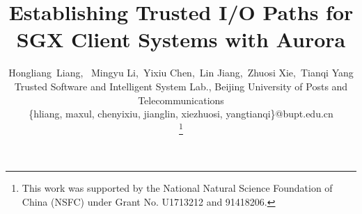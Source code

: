 \documentclass[journal,twocolumn,letterpaper,10pt]{ieee-sty/IEEEtran}
\begin{document}


\title{ Establishing Trusted I/O Paths for \\SGX Client Systems with Aurora }
\author{Hongliang~Liang,~
	Mingyu Li,~Yixiu Chen,~Lin Jiang,~Zhuosi Xie,~Tianqi Yang\\
	Trusted Software and Intelligent System Lab.,
	Beijing University of Posts and Telecommunications\\
	\{hliang, maxul, chenyixiu, jianglin, xiezhuosi, yangtianqi\}@bupt.edu.cn\\
    \thanks{This work was supported by the National Natural Science Foundation of China (NSFC) under Grant No. U1713212 and 91418206.}
}

\maketitle









\end{document}
